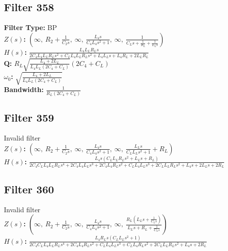 \documentclass{article}
\begin{document}
\subsection*{Filter 358}
\textbf{Filter Type:} BP \\ 
\textbf{$Z(s)$:} $\left( \infty, \  R_{2} + \frac{1}{C_{2} s}, \  \infty, \  \frac{L_{4} s}{C_{4} L_{4} s^{2} + 1}, \  \infty, \  \frac{1}{C_{L} s + \frac{1}{R_{L}} + \frac{1}{L_{L} s}}\right)$ \\ 
\textbf{$H(s)$:} $\frac{L_{4} L_{L} R_{L} s}{2 C_{4} L_{4} L_{L} R_{L} s^{2} + C_{L} L_{4} L_{L} R_{L} s^{2} + L_{4} L_{L} s + L_{4} R_{L} + 2 L_{L} R_{L}}$ \\ 
\textbf{Q:} $R_{L} \sqrt{\frac{L_{4} + 2 L_{L}}{L_{4} L_{L} \left(2 C_{4} + C_{L}\right)}} \left(2 C_{4} + C_{L}\right)$ \\ 
\textbf{$\omega_0$:} $\sqrt{\frac{L_{4} + 2 L_{L}}{L_{4} L_{L} \left(2 C_{4} + C_{L}\right)}}$ \\ 
\textbf{Bandwidth:} $\frac{1}{R_{L} \left(2 C_{4} + C_{L}\right)}$ \\ 
\subsection*{Filter 359}
Invalid filter \\ 
\textbf{$Z(s)$:} $\left( \infty, \  R_{2} + \frac{1}{C_{2} s}, \  \infty, \  \frac{L_{4} s}{C_{4} L_{4} s^{2} + 1}, \  \infty, \  \frac{L_{L} s}{C_{L} L_{L} s^{2} + 1} + R_{L}\right)$ \\ 
\textbf{$H(s)$:} $\frac{L_{4} s \left(C_{L} L_{L} R_{L} s^{2} + L_{L} s + R_{L}\right)}{2 C_{4} C_{L} L_{4} L_{L} R_{L} s^{4} + 2 C_{4} L_{4} L_{L} s^{3} + 2 C_{4} L_{4} R_{L} s^{2} + C_{L} L_{4} L_{L} s^{3} + 2 C_{L} L_{L} R_{L} s^{2} + L_{4} s + 2 L_{L} s + 2 R_{L}}$ \\ 
\subsection*{Filter 360}
Invalid filter \\ 
\textbf{$Z(s)$:} $\left( \infty, \  R_{2} + \frac{1}{C_{2} s}, \  \infty, \  \frac{L_{4} s}{C_{4} L_{4} s^{2} + 1}, \  \infty, \  \frac{R_{L} \left(L_{L} s + \frac{1}{C_{L} s}\right)}{L_{L} s + R_{L} + \frac{1}{C_{L} s}}\right)$ \\ 
\textbf{$H(s)$:} $\frac{L_{4} R_{L} s \left(C_{L} L_{L} s^{2} + 1\right)}{2 C_{4} C_{L} L_{4} L_{L} R_{L} s^{4} + 2 C_{4} L_{4} R_{L} s^{2} + C_{L} L_{4} L_{L} s^{3} + C_{L} L_{4} R_{L} s^{2} + 2 C_{L} L_{L} R_{L} s^{2} + L_{4} s + 2 R_{L}}$ \\ 
\end{document}
